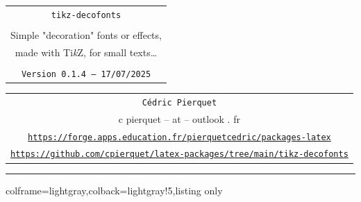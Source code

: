 \documentclass[11pt,a4paper]{ltxdoc}
\def\TPversion{0.1.4}
\def\TPdate{17/07/2025}
\begin{document}
\thispagestyle{empty}

\begin{center}
	\begin{minipage}{0.88\linewidth}
		\begin{tcolorbox}[colframe=yellow,colback=yellow!15]
			\begin{center}
				\renewcommand{\arraystretch}{1.25}%
				\begin{tabular}{c}
					{\Huge \texttt{tikz-decofonts}}\\
					\\
					{\LARGE Simple "decoration" fonts or effects,} \\
					{\LARGE made with Ti\textit{k}Z, for small texts\ldots} \\
					\\
					{\small \texttt{Version \TPversion{} -- \TPdate}}
				\end{tabular}
			\end{center}
		\end{tcolorbox}
	\end{minipage}
\end{center}

\begin{center}
	\begin{tabular}{c}
		\texttt{Cédric Pierquet}\\
		{\ttfamily c pierquet -- at -- outlook . fr}\\
		\texttt{\url{https://forge.apps.education.fr/pierquetcedric/packages-latex}} \\
		\texttt{\url{https://github.com/cpierquet/latex-packages/tree/main/tikz-decofonts}} \\
	\end{tabular}
\end{center}

\hrule

\vfill

\begin{tcblisting}{colframe=lightgray,colback=lightgray!5,listing only}
\end{tcblisting}

\begin{tcolorbox}[colframe=lightgray,colback=lightgray!5]
\end{tcolorbox}
\end{document}
